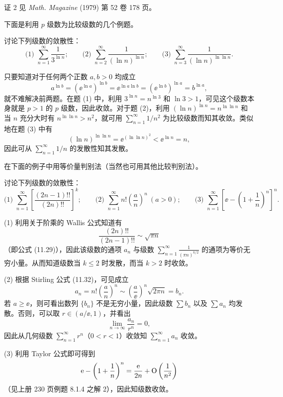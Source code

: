\begin{xremark}
证 2 见 \textit{Math. Magazine} (1979) 第 52 卷 178 页。
\end{xremark}

下面是利用 $p$ 级数为比较级数的几个例题。

\begin{xexample}[13.2.2]
讨论下列级数的敛散性：
\[
\text{(1) }\sum_{n=1}^{\infty}\frac1{3^{\ln n}};\qquad
\text{(2) }\sum_{n=2}^{\infty}\frac1{(\ln n)^{\ln n}};\qquad
\text{(3) }\sum_{n=3}^{\infty}\frac1{(\ln n)^{\ln\ln n}}.
\]
\end{xexample}
\begin{xsolution}
只要知道对于任何两个正数 $a,b>0$ 均成立
\[
a^{\ln b}=(\ee^{\ln a})^{\ln b}=\ee^{\ln a\ln b}=(\ee^{\ln b})^{\ln a}=b^{\ln a},
\]
就不难解决前两题。在题 (1) 中，利用 $3^{\ln n}=n^{\ln3}$ 和 $\ln3>1$，可见这个级数本身就是 $p>1$ 的 $p$ 级数，因此收敛。对于题 (2)，利用 $(\ln n)^{\ln n}=n^{\ln\ln n}$ 和当 $n$ 充分大时有 $n^{\ln\ln n}>n^2$，就可用 $\sum_{n=1}^{\infty}1/n^2$ 为比较级数而知其收敛。类似地在题 (3) 中有
\[
(\ln n)^{\ln\ln n}=\ee^{(\ln\ln n)^2}<\ee^{\ln n}=n,
\]
因此可从 $\sum_{n=1}^{\infty}1/n$ 的发散性知其发散。
\end{xsolution}

在下面的例子中用等价量判别法（当然也可用其他比较判别法）。

\begin{xexample}[13.2.3]
讨论下列级数的敛散性：
\[
\text{(1) }\sum_{n=1}^{\infty}\left[\frac{(2n-1)!!}{(2n)!!}\right]^k;\qquad
\text{(2) }\sum_{n=1}^{\infty}n!\left(\frac an\right)^n\ (a>0);\qquad
\text{(3) }\sum_{n=1}^{\infty}\left[\ee-\left(1+\frac1n\right)^n\right]^n.
\]
\end{xexample}
\begin{xsolution}
(1) 利用关于阶乘的 Wallis 公式知道有
\[
\frac{(2n)!!}{(2n-1)!!}\sim\sqrt{\pi n}
\]
（即公式 (11.29)），因此该级数的通项 $a_n$ 与级数 $\sum_{n=1}^{\infty}\frac1{(\pi n)^{k/2}}$ 的通项为等价无穷小量。从而知道级数当 $k\leq2$ 时发散，而当 $k>2$ 时收敛。

(2) 根据 Stirling 公式 (11.32)，可见成立
\[
a_n=n!\left(\frac an\right)^n\sim\left(\frac a\ee\right)^n\sqrt{2\pi n}=b_n.
\]
若 $a\geq\ee$，则可看出数列 $\{b_n\}$ 不是无穷小量，因此级数 $\sum b_n$ 以及 $\sum a_n$ 均发散。否则，可以取 $r\in(a/\ee,1)$，并看出
\[
\lim_{n\to\infty}\frac{a_n}{r^n}=0,
\]
因此从几何级数 $\sum_{n=1}^{\infty}r^n$（$0<r<1$）收敛知 $\sum_{n=1}^{\infty}a_n$ 收敛。

(3) 利用 Taylor 公式即可得到
\[
\mathrm{e}-\left(1+\frac1n\right)^n=\frac{\mathrm{e}}{2n}+\mathrm{O}\left(\frac1{n^2}\right)
\]
（见上册 230 页例题 8.1.4 之解 2），因此知级数收敛。
\end{xsolution}

